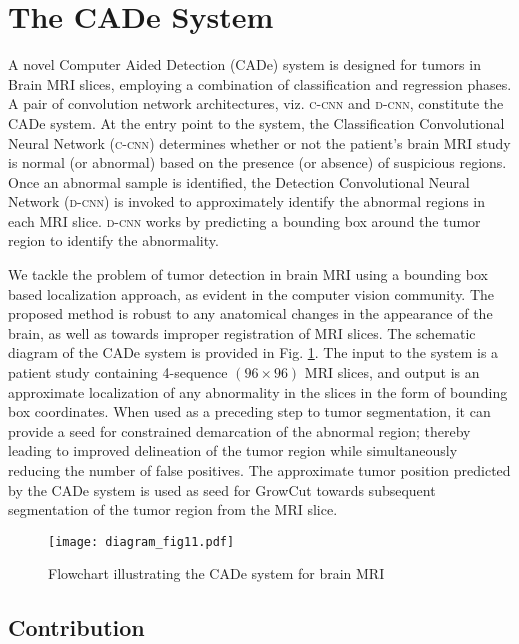 \documentclass[journal,twocolumn]{IEEEtran}
\begin{document}
\section{The CADe System}
\label{sec:contrib}

A novel  Computer Aided Detection (CADe) system is designed  for tumors in Brain MRI slices, employing  a combination of classification and regression phases. A pair of convolution network  architectures, viz. {\scshape{c-cnn}} and {\scshape{d-cnn}}, constitute the CADe system. At the entry point to the system, the Classification Convolutional Neural Network ({\scshape{c-cnn}}) determines whether  or not the patient's brain MRI study is normal (or abnormal) based on the presence (or absence) of suspicious regions. Once an abnormal sample  is identified, the Detection Convolutional Neural Network ({\scshape{d-cnn}}) is invoked to approximately identify the abnormal regions in each MRI slice. {\scshape{d-cnn}} works by predicting a bounding box around the tumor region to identify the abnormality.

We tackle the problem of tumor detection in brain MRI using a bounding box based localization approach, as evident in  the computer vision community. The proposed method is robust to any anatomical changes in the appearance of the brain, as well as towards improper registration of MRI slices. The schematic diagram of the CADe system is provided  in Fig. \ref{fig:cade}. The input to the system is a patient study containing 4-sequence $(96 \times 96)$ MRI slices, and output is an approximate localization of any abnormality in the slices in the form of bounding box coordinates. When used  as a preceding  step to tumor  segmentation, it can provide a seed for constrained  demarcation  of the abnormal region; thereby  leading to improved delineation of the tumor region while simultaneously reducing the number of false positives.   The approximate tumor position predicted by the  CADe system is used as  seed for GrowCut \cite{Vezhnevets2005_growcut} towards subsequent  segmentation of the  tumor region from the MRI slice.

\begin{figure}[]
\begin{center}
	\texttt{[image: diagram\_fig11.pdf]}
	\caption{Flowchart illustrating the CADe system for brain MRI}
	\label{fig:cade}
\end{center}
\end{figure}

\subsection{Contribution}
\end{document}
